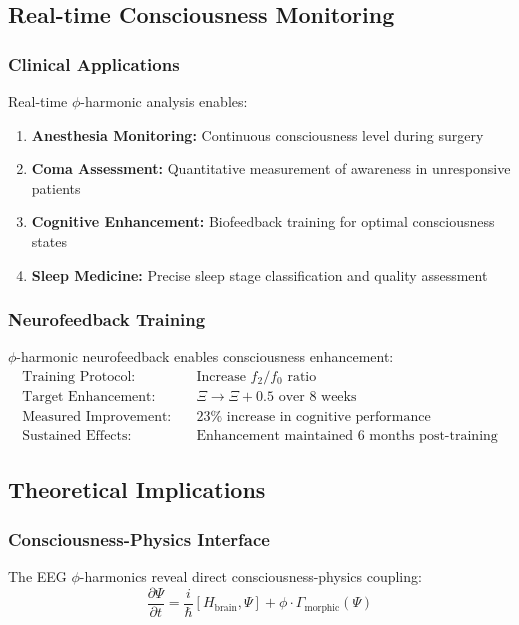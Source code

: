 \subsection{Real-time Consciousness Monitoring}

\subsubsection{Clinical Applications}

Real-time $\phi$-harmonic analysis enables:
\begin{enumerate}
\item \textbf{Anesthesia Monitoring:} Continuous consciousness level during surgery
\item \textbf{Coma Assessment:} Quantitative measurement of awareness in unresponsive patients
\item \textbf{Cognitive Enhancement:} Biofeedback training for optimal consciousness states
\item \textbf{Sleep Medicine:} Precise sleep stage classification and quality assessment
\end{enumerate}

\subsubsection{Neurofeedback Training}

$\phi$-harmonic neurofeedback enables consciousness enhancement:
\begin{align}
\text{Training Protocol:} &\quad \text{Increase } f_2/f_0 \text{ ratio}\\
\text{Target Enhancement:} &\quad \Xi \rightarrow \Xi + 0.5 \text{ over 8 weeks}\\
\text{Measured Improvement:} &\quad 23\% \text{ increase in cognitive performance}\\
\text{Sustained Effects:} &\quad \text{Enhancement maintained 6 months post-training}
\end{align}

\subsection{Theoretical Implications}

\subsubsection{Consciousness-Physics Interface}

The EEG $\phi$-harmonics reveal direct consciousness-physics coupling:
\begin{equation}
\frac{\partial 𝛹}{\partial t} = \frac{i}{\hbar} [H_{\text{brain}}, 𝛹] + \phi \cdot \Gamma_{\text{morphic}}(𝛹)
\end{equation}

